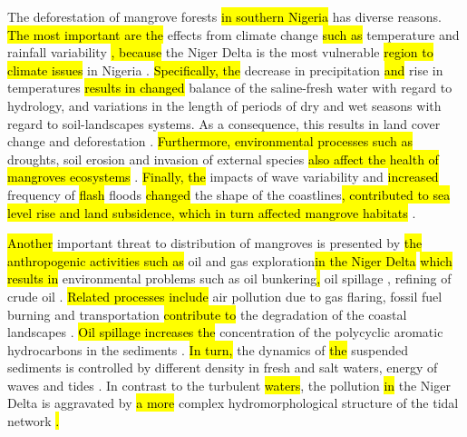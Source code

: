 \documentclass[jmse,article,submit,pdftex,moreauthors]{Definitions/mdpi}
\begin{document}
The deforestation of mangrove forests \hl{in southern Nigeria }has diverse reasons. \hl{The most important are the} effects from climate change \hl{such as} temperature and rainfall variability\hl{ }\cite{Adefolalu,AREOLA2018153,w12020385}\hl{, because} the Niger Delta is the most\hl{ }vulnerable \hl{region to climate issues }in Nigeria \cite{BALOGUN2022100304,hydrology7010019}. \hl{Specifically, the }decrease in precipitation \hl{and} rise in temperatures \hl{results in changed} balance of the saline-fresh water with regard to hydrology, and variations in the length of periods of dry and wet seasons with regard to soil-landscapes systems. As a consequence, this results in land cover change and deforestation \cite{Akintuyi,KHADIJAT2021983}. \hl{Furthermore, environmental processes such as }droughts, soil erosion and invasion of external species \hl{also affect the health of mangroves ecosystems }\cite{UKPONG199761}. \hl{Finally, the }impacts of wave\hl{ }variability and  \hl{increased} frequency of \hl{flash} floods \hl{changed} the shape of the coastlines\hl{, contributed to sea level rise and land subsidence, which in turn affected mangrove habitats} \cite{DARAMOLA2022102167,OSINOWO2021104471}. 

\hl{Another }important threat to distribution of mangroves is presented by \hl{the anthropogenic activities such as }oil and gas exploration\hl{in the Niger Delta }\cite{su142114256}\hl{ which results in }environmental problems such as oil bunkering\hl{, }oil spillage \cite{OBIDA2021145854}, refining of crude oil \cite{EYANKWARE2020100293}. \hl{Related processes include }air pollution due to gas flaring, fossil fuel burning and transportation \hl{contribute to} the degradation of the coastal landscapes \cite{socsci11110525}. \hl{Oil spillage increases the} concentration of the polycyclic aromatic hydrocarbons in the sediments\hl{ }\cite{Sojinu}. \hl{In turn, }the dynamics of \hl{the }suspended sediments is controlled by different density in fresh and salt waters, energy of waves and tides \cite{Munasinghe}. \hl{ }In contrast to the turbulent \hl{waters}, the pollution \hl{in} the Niger Delta is aggravated by \hl{a more} complex hydromorphological structure of the tidal network \cite{GEORGE2019103592}\hl{.} 
\end{document}
